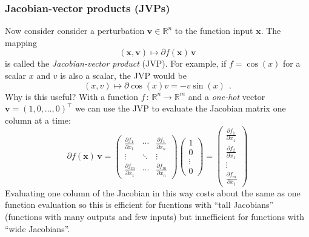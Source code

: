 \documentclass[12pt,dvipsnames]{report}
\renewcommand{\vec}[1]{\boldsymbol{\mathbf{#1}}}
\newcommand{\hquad}{~~}
\begin{document}
\subsubsection{Jacobian-vector products (JVPs)}
Now consider consider a perturbation $\vec v\in\mathbb{R}^n$ to the function input 
$\vec x$. The  mapping 
\begin{equation}
(\vec{x}, \vec{v}) \mapsto \partial f(\vec{x})\,\vec v
\label{eq:jvp}
\end{equation}
is called the \textsl{Jacobian-vector product} (JVP). For example, if $f=\cos(x)$ 
for a scalar $x$ and $v$ is also a scalar, the JVP would be 
\begin{equation}
(x, v) \mapsto \partial \cos (x) v=-v \sin (x)\hquad .
\end{equation}
Why is this useful? With a function $f\,:\,\mathbb{R}^n\rightarrow\mathbb{R}^m$
and a \textsl{one-hot} vector $\vec v=(1, 0, \ldots, 0)^\intercal$ we can use  the JVP to 
evaluate the Jacobian matrix one column at a time:
\begin{equation}
    \partial f(\vec x)\,\vec v = 
    \begin{pmatrix}
\frac{\partial f_{1}}{\partial x_{1}} & \cdots & \frac{\partial f_{1}}{\partial x_{n}} \\
\vdots & \ddots & \vdots \\
\frac{\partial f_{m}}{\partial x_{1}} & \cdots & \frac{\partial f_{m}}{\partial x_{n}}
    \end{pmatrix}
    \begin{pmatrix}
        1\\
        0\\
        \vdots\\
        0
    \end{pmatrix}
    = \begin{pmatrix}
        \frac{\partial f_{1}}{\partial x_{1}}\\
        \frac{\partial f_{2}}{\partial x_{1}}\\
        \vdots\\
        \frac{\partial f_{m}}{\partial x_{1}}
    \end{pmatrix}
\end{equation}
Evaluating one column of the Jacobian in this way costs about the same as one function evaluation
so this is efficient for fucntions with ``tall Jacobians'' (functions with many outputs and few
inputs) but innefficient for functions with ``wide Jacobians''.
\end{document}
